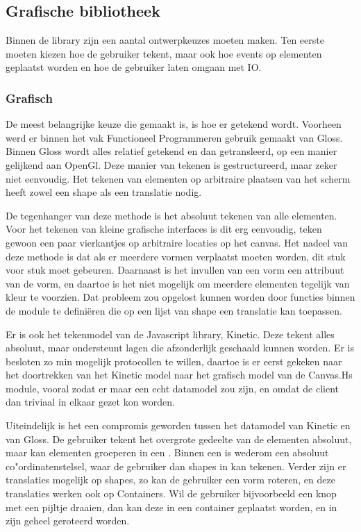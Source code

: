 \subsection{Grafische bibliotheek} \label{subsec:grafische_bibliotheek}

Binnen de library zijn een aantal ontwerpkeuzes moeten maken. Ten eerste moeten kiezen hoe de gebruiker tekent, maar ook hoe events op elementen geplaatst worden en hoe de gebruiker laten omgaan met IO.

\subsubsection{Grafisch}
De meest belangrijke keuze die gemaakt is, is hoe er getekend wordt. Voorheen werd er binnen het vak Functioneel Programmeren gebruik gemaakt van Gloss. Binnen Gloss wordt alles relatief getekend en dan getransleerd, op een manier gelijkend aan OpenGl. Deze manier van tekenen is gestructureerd, maar zeker niet eenvoudig. Het tekenen van elementen op arbitraire plaatsen van het scherm heeft zowel een shape als een translatie nodig.

De tegenhanger van deze methode is het absoluut tekenen van alle elementen. Voor het tekenen van kleine grafische interfaces is dit erg eenvoudig, teken gewoon een paar vierkantjes op arbitraire locaties op het canvas. Het nadeel van deze methode is dat als er meerdere vormen verplaatst moeten worden, dit stuk voor stuk moet gebeuren. Daarnaast is het invullen van een vorm een attribuut van de vorm, en daartoe is het niet mogelijk om meerdere elementen tegelijk van kleur te voorzien. Dat probleem zou opgelost kunnen worden door functies binnen de module te defini\"eren die op een lijst van shape een translatie kan toepassen.

Er is ook het tekenmodel van de Javascript library, Kinetic. Deze tekent alles absoluut, maar ondersteunt lagen die afzonderlijk geschaald kunnen worden. Er is besloten zo min mogelijk protocollen te willen, daartoe is er eerst gekeken naar het doortrekken van het Kinetic model naar het grafisch model van de Canvas.Hs module, vooral zodat er maar een echt datamodel zou zijn, en omdat de client dan triviaal in elkaar gezet kon worden.

Uiteindelijk is het een compromis geworden tussen het datamodel van Kinetic en van Gloss. De gebruiker tekent het overgrote gedeelte van de elementen absoluut, maar kan elementen groeperen in een . Binnen een  is wederom een absoluut co"ordinatenstelsel, waar de gebruiker dan shapes in kan tekenen. Verder zijn er translaties mogelijk op shapes, zo kan de gebruiker een vorm roteren, en deze translaties werken ook op Containers. Wil de gebruiker bijvoorbeeld een knop met een pijltje draaien, dan kan deze in een container geplaatst worden, en in zijn geheel geroteerd worden.

